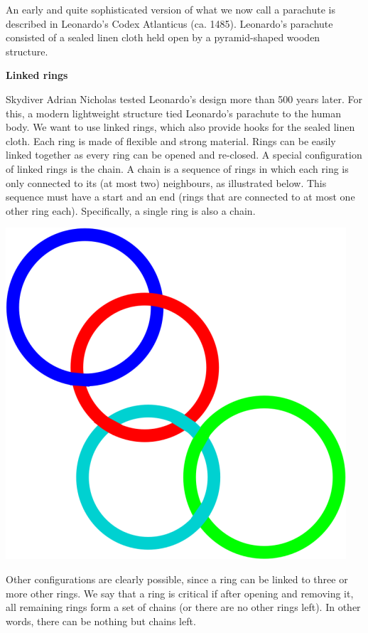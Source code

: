 An early and quite sophisticated version of what we now call a parachute is described in Leonardo's Codex Atlanticus (ca. 1485). Leonardo's parachute consisted of a sealed linen cloth held open by a pyramid-shaped wooden structure.

\bf{Linked rings}

Skydiver Adrian Nicholas tested Leonardo's design more than 500 years later. For this, a modern lightweight structure tied Leonardo's parachute to the human body. We want to use linked rings, which also provide hooks for the sealed linen cloth. Each ring is made of flexible and strong material. Rings can be easily linked together as every ring can be opened and re-closed. A special configuration of linked rings is the chain. A chain is a sequence of rings in which each ring is only connected to its (at most two) neighbours, as illustrated below. This sequence must have a start and an end (rings that are connected to at most one other ring each). Specifically, a single ring is also a chain.

\includegraphics{image_000.png}

Other configurations are clearly possible, since a ring can be linked to three or more other rings. We say that a ring is critical if after opening and removing it, all remaining rings form a set of chains (or there are no other rings left). In other words, there can be nothing but chains left.

